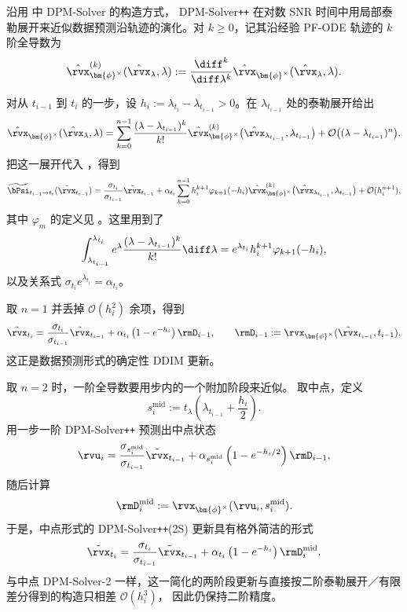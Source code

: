 沿用  中 DPM-Solver 的构造方式，
DPM-Solver\texttt{++} 在对数 SNR 时间中用局部泰勒展开来近似数据预测沿轨迹的演化。对 $k\geq0$，记其沿经验 PF-ODE
轨迹的 $k$ 阶全导数为
\[
\hat{\rvx}_{\bm{\phi}^\times}^{(k)}
(\hat\rvx_\lambda,\lambda)
:=
\frac{\diff^k}{\diff\lambda^k}
\hat{\rvx}_{\bm{\phi}^\times}
(\hat\rvx_\lambda,\lambda).
\]

对从 $t_{i-1}$ 到 $t_i$ 的一步，设
$h_i
:=
\lambda_{t_i}-\lambda_{t_{i-1}}
>0$。在 $\lambda_{t_{i-1}}$ 处的泰勒展开给出
\[
\hat{\rvx}_{\bm{\phi}^\times}
(\hat\rvx_\lambda,\lambda)
=
\sum_{k=0}^{n-1}
\frac{
(\lambda-\lambda_{t_{i-1}})^k
}{
k!
}
\hat{\rvx}_{\bm{\phi}^\times}^{(k)}
\bigl(
\hat\rvx_{\lambda_{t_{i-1}}},
\lambda_{t_{i-1}}
\bigr)
+
\mathcal O
\bigl(
(\lambda-\lambda_{t_{i-1}})^n
\bigr).
\]
把这一展开代入 ，得到
\begin{align}
\label{eq:dpmpp-taylor-expansion}
\widetilde\bPsi_{t_{i-1}\to t_i}
(\tilde\rvx_{t_{i-1}})
=
\frac{\sigma_{t_i}}{\sigma_{t_{i-1}}}
\tilde\rvx_{t_{i-1}}
+
\alpha_{t_i}
\sum_{k=0}^{n-1}
h_i^{k+1}
\varphi_{k+1}(-h_i)
\hat{\rvx}_{\bm{\phi}^\times}^{(k)}
\bigl(
\hat\rvx_{\lambda_{t_{i-1}}},
\lambda_{t_{i-1}}
\bigr)
+
\mathcal O(h_i^{n+1}),
\end{align}
其中 $\varphi_m$ 的定义见 。这里用到了
\[
\int_{\lambda_{t_{i-1}}}^{\lambda_{t_i}}
e^\lambda
\frac{
(\lambda-\lambda_{t_{i-1}})^k
}{
k!
}
\diff\lambda
=
e^{\lambda_{t_i}}
h_i^{k+1}
\varphi_{k+1}(-h_i),
\]
以及关系式
$\sigma_{t_i}e^{\lambda_{t_i}}=\alpha_{t_i}$。

取 $n=1$ 并丢掉 $\mathcal O(h_i^2)$ 余项，得到
\[
\tilde\rvx_{t_i}
=
\frac{\sigma_{t_i}}{\sigma_{t_{i-1}}}
\tilde\rvx_{t_{i-1}}
+
\alpha_{t_i}
\left(
1-e^{-h_i}
\right)
\rmD_{i-1},
\qquad
\rmD_{i-1}
:=
\rvx_{\bm{\phi}^\times}
(\tilde\rvx_{t_{i-1}},t_{i-1}),
\]
这正是数据预测形式的确定性 DDIM 更新。

取 $n=2$ 时，一阶全导数要用步内的一个附加阶段来近似。
取中点，定义
\[
s_i^{\mathrm{mid}}
:=
t_\lambda
\left(
\lambda_{t_{i-1}}+\frac{h_i}{2}
\right).
\]
用一步一阶 DPM-Solver\texttt{++} 预测出中点状态
\[
\rvu_i
=
\frac{
\sigma_{s_i^{\mathrm{mid}}}
}{
\sigma_{t_{i-1}}
}
\tilde\rvx_{t_{i-1}}
+
\alpha_{s_i^{\mathrm{mid}}}
\left(
1-e^{-h_i/2}
\right)
\rmD_{i-1},
\]
随后计算
\[
\rmD_i^{\mathrm{mid}}
:=
\rvx_{\bm{\phi}^\times}
(\rvu_i,s_i^{\mathrm{mid}}).
\]
于是，中点形式的 DPM-Solver\texttt{++}(2S) 更新具有格外简洁的形式
\[
\tilde\rvx_{t_i}
=
\frac{\sigma_{t_i}}{\sigma_{t_{i-1}}}
\tilde\rvx_{t_{i-1}}
+
\alpha_{t_i}
\left(
1-e^{-h_i}
\right)
\rmD_i^{\mathrm{mid}}.
\]
与中点 DPM-Solver-2 一样，这一简化的两阶段更新与直接按二阶泰勒展开／有限差分得到的构造只相差 $\mathcal O(h_i^3)$，
因此仍保持二阶精度。

